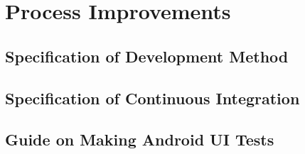 \chapter{Process Improvements}
\dummy

\section{Specification of Development Method}
\dummy

\section{Specification of Continuous Integration}
\dummy

\section{Guide on Making Android UI Tests}
\dummy